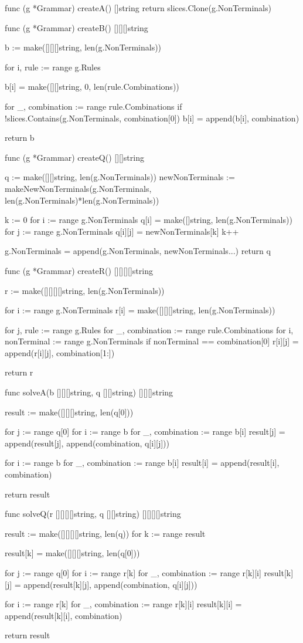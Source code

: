 func (g *Grammar) createA() []string {
	return slices.Clone(g.NonTerminals)
}

func (g *Grammar) createB() [][][]string {
	b := make([][][]string, len(g.NonTerminals))

	for i, rule := range g.Rules {
		b[i] = make([][]string, 0, len(rule.Combinations))

		for _, combination := range rule.Combinations {
			if !slices.Contains(g.NonTerminals, combination[0]) {
				b[i] = append(b[i], combination)
			}
		}
	}

	return b
}

func (g *Grammar) createQ() [][]string {
	q := make([][]string, len(g.NonTerminals))
	newNonTerminals := makeNewNonTerminals(g.NonTerminals, len(g.NonTerminals)*len(g.NonTerminals))

	k := 0
	for i := range g.NonTerminals {
		q[i] = make([]string, len(g.NonTerminals))
		for j := range g.NonTerminals {
			q[i][j] = newNonTerminals[k]
			k++
		}
	}

	g.NonTerminals = append(g.NonTerminals, newNonTerminals...)
	return q
}

func (g *Grammar) createR() [][][][]string {
	r := make([][][][]string, len(g.NonTerminals))

	for i := range g.NonTerminals {
		r[i] = make([][][]string, len(g.NonTerminals))
	}

	for j, rule := range g.Rules {
		for _, combination := range rule.Combinations {
			for i, nonTerminal := range g.NonTerminals {
				if nonTerminal == combination[0] {
					r[i][j] = append(r[i][j], combination[1:])
				}
			}
		}
	}

	return r
}

func solveA(b [][][]string, q [][]string) [][][]string {
	result := make([][][]string, len(q[0]))

	for j := range q[0] {
		for i := range b {
			for _, combination := range b[i] {
				result[j] = append(result[j], append(combination, q[i][j]))
			}
		}
	}

	for i := range b {
		for _, combination := range b[i] {
			result[i] = append(result[i], combination)
		}
	}

	return result
}

func solveQ(r [][][][]string, q [][]string) [][][][]string {
	result := make([][][][]string, len(q))
	for k := range result {
		result[k] = make([][][]string, len(q[0]))

		for j := range q[0] {
			for i := range r[k] {
				for _, combination := range r[k][i] {
					result[k][j] = append(result[k][j], append(combination, q[i][j]))
				}
			}
		}

		for i := range r[k] {
			for _, combination := range r[k][i] {
				result[k][i] = append(result[k][i], combination)
			}
		}
	}

	return result
}

